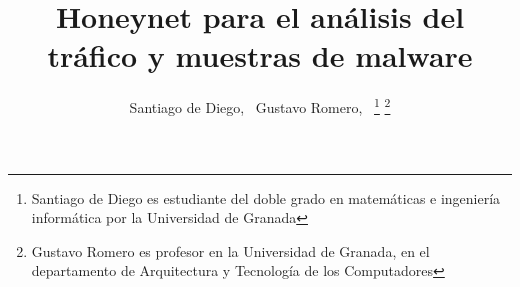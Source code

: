 \documentclass[journal]{IEEEtran}
\begin{document}
%
\title{Honeynet para el análisis del tráfico y muestras de malware}
%
%
%

\author{Santiago de Diego,~
        Gustavo Romero,~
\thanks{Santiago de Diego es estudiante del doble grado en matemáticas e ingeniería informática por la Universidad de Granada}%
\thanks{Gustavo Romero es profesor en la Universidad de Granada, en el departamento de Arquitectura y Tecnología de los Computadores}}

% 
%



\markboth{}%
{}
% 
\end{document}
